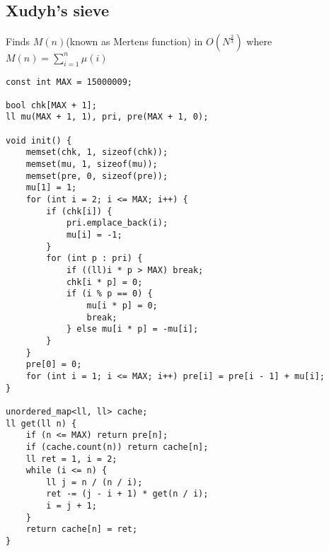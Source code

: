 \documentclass[landscape, 8pt, a4paper, oneside, twocolumn]{extarticle}
\begin{document}
\subsection{Xudyh's sieve}
{Finds $M(n)$(known as Mertens function) in $O(N^{\frac{2}{3}})$ where $M(n)=\sum_{i=1}^n \mu(i)$}
\begin{verbatim}
const int MAX = 15000009;

bool chk[MAX + 1];
ll mu(MAX + 1, 1), pri, pre(MAX + 1, 0);

void init() {
    memset(chk, 1, sizeof(chk));
    memset(mu, 1, sizeof(mu));
    memset(pre, 0, sizeof(pre));
    mu[1] = 1;
    for (int i = 2; i <= MAX; i++) {
        if (chk[i]) {
            pri.emplace_back(i);
            mu[i] = -1;
        }
        for (int p : pri) {
            if ((ll)i * p > MAX) break;
            chk[i * p] = 0;
            if (i % p == 0) {
                mu[i * p] = 0;
                break;
            } else mu[i * p] = -mu[i];
        }
    }
    pre[0] = 0;
    for (int i = 1; i <= MAX; i++) pre[i] = pre[i - 1] + mu[i];
}

unordered_map<ll, ll> cache;
ll get(ll n) {
    if (n <= MAX) return pre[n];
    if (cache.count(n)) return cache[n];
    ll ret = 1, i = 2;
    while (i <= n) {
        ll j = n / (n / i);
        ret -= (j - i + 1) * get(n / i);
        i = j + 1;
    }
    return cache[n] = ret;
}
\end{verbatim}
\end{document}
